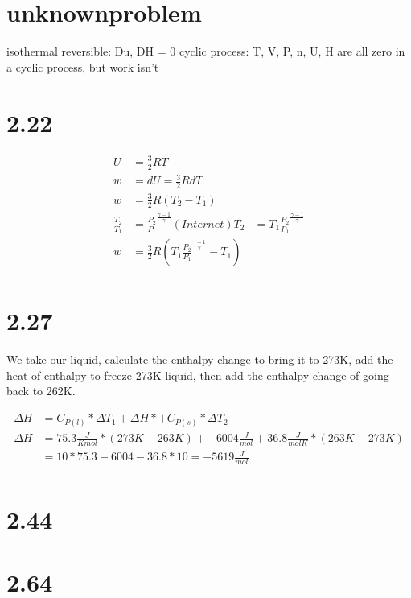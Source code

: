 \documentclass[10pt]{article} %
\begin{document}
\section{unknownproblem}
isothermal reversible: Du, DH = 0
cyclic process: T, V, P, n, U, H are all zero in a cyclic process, but work isn't

\section{2.22}
\begin{align}
  U &= \frac{3}{2}RT\\
  w &= dU = \frac{3}{2}RdT\\
  w &= \frac{3}{2}R(T_2 - T_1)\\
  \frac{T_2}{T_1} &= \frac{P_2}{P_1}^\frac{\gamma - 1}{\gamma} (Internet)
  T_2 &= T_1\frac{P_2}{P_1}^\frac{\gamma - 1}{\gamma}\\
  w &= \frac{3}{2}R(T_1\frac{P_2}{P_1}^\frac{\gamma - 1}{\gamma} - T_1)\\
\end{align}

\section{2.27}

We take our liquid, calculate the enthalpy change to bring it to 273K, add the heat of enthalpy to freeze 273K liquid, then add the enthalpy change of going back to 262K.

\begin{align}
  \Delta H &= C_{P(l)} * \Delta T_1 + \Delta H* + C_{P(s)} * \Delta T_2\\
  \Delta H &= 75.3 \frac{J}{K mol} * (273K - 263K) + -6004 \frac{J}{mol} + 36.8 \frac{J}{mol K} * (263K - 273K)\\
   &= 10*75.3 - 6004 - 36.8*10 = -5619 \frac{J}{mol}\\
\end{align}

\section{2.44}


\section{2.64}
\end{document}
